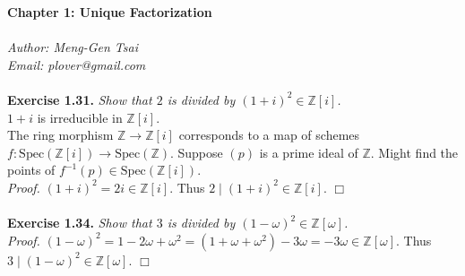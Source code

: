 \documentclass{article}
\begin{document}
\textbf{\Large Chapter 1: Unique Factorization} \\\\



\emph{Author: Meng-Gen Tsai} \\
\emph{Email: plover@gmail.com} \\\\




\textbf{Exercise 1.31.}
\emph{Show that $2$ is divided by $(1+i)^2 \in \mathbb{Z}[i]$.} \\

$1+i$ is irreducible in $\mathbb{Z}[i]$. \\

The ring morphism $\mathbb{Z} \rightarrow \mathbb{Z}[i]$
corresponds to a map of schemes
$f: \text{Spec}(\mathbb{Z}[i]) \rightarrow \text{Spec}(\mathbb{Z})$.
Suppose $(p)$ is a prime ideal of $\mathbb{Z}$.
Might find the points of $f^{-1}(p) \in \text{Spec}(\mathbb{Z}[i])$. \\

\emph{Proof.}
$(1+i)^2 = 2i \in \mathbb{Z}[i]$.
Thus $2 \mid (1+i)^2 \in \mathbb{Z}[i]$.
$\Box$ \\\\



\textbf{Exercise 1.34.}
\emph{Show that $3$ is divided by $(1-\omega)^2 \in \mathbb{Z}[\omega]$.} \\

\emph{Proof.}
$(1 - \omega)^2
= 1 - 2\omega + \omega^2
= (1 + \omega + \omega^2) - 3 \omega
= - 3 \omega \in \mathbb{Z}[\omega]$.
Thus $3 \mid (1 - \omega)^2 \in \mathbb{Z}[\omega]$.
$\Box$ \\\\
\end{document}
